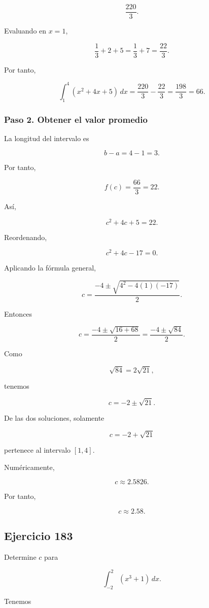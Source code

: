 \documentclass[12pt]{article}
\begin{document}
\[
\frac{220}{3}.
\]

Evaluando en \(x=1\),

\[
\frac13+2+5
=
\frac13+7
=
\frac{22}{3}.
\]

Por tanto,

\[
\int_1^4(x^2+4x+5)\,dx
=
\frac{220}{3}-\frac{22}{3}
=
\frac{198}{3}
=
66.
\]

\subsubsection*{Paso 2. Obtener el valor promedio}

La longitud del intervalo es

\[
b-a=4-1=3.
\]

Por tanto,

\[
f(c)=\frac{66}{3}=22.
\]

Así,

\[
c^2+4c+5=22.
\]

Reordenando,

\[
c^2+4c-17=0.
\]

Aplicando la fórmula general,

\[
c=
\frac{-4\pm\sqrt{4^2-4(1)(-17)}}{2}.
\]

Entonces

\[
c=
\frac{-4\pm\sqrt{16+68}}{2}
=
\frac{-4\pm\sqrt{84}}{2}.
\]

Como

\[
\sqrt{84}=2\sqrt{21},
\]

tenemos

\[
c=-2\pm\sqrt{21}.
\]

De las dos soluciones, solamente

\[
c=-2+\sqrt{21}
\]

pertenece al intervalo \([1,4]\).

Numéricamente,

\[
c\approx2.5826.
\]

Por tanto,

\[
\boxed{c\approx2.58}.
\]

\subsection*{Ejercicio 183}

Determine \(c\) para

\[
\int_{-2}^{2}(x^3+1)\,dx.
\]

Tenemos
\end{document}
